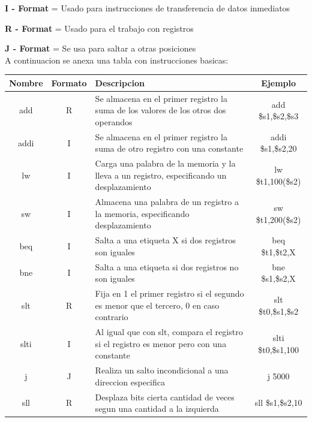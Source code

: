 \documentclass{article}
\begin{document}
    \textbf{I - Format} = Usado para instrucciones de transferencia de datos inmediatos

    \textbf{R - Format} = Usado para el trabajo con registros 

    \textbf{J - Format }= Se usa para saltar a otras posiciones \\
    
A continuacion se anexa una tabla con instrucciones basicas:

\begin{table}[h]
\centering
\begin{tabular}{|c|c|p{6.5cm}|c|}
\hline
\textbf{Nombre} & \textbf{Formato} & \textbf{Descripcion} & \textbf{Ejemplo} \\ \hline
add  & R & Se almacena en el primer registro la suma de los valores de los otros dos operandos & add \$s1,\$s2,\$s3 \\ \hline
addi & I & Se almacena en el primer registro la suma de otro registro con una constante & addi \$s1,\$s2,20 \\ \hline
lw   & I & Carga una palabra de la memoria y la lleva a un registro, especificando un desplazamiento & lw \$t1,100(\$s2) \\ \hline
sw   & I & Almacena una palabra de un registro a la memoria, especificando desplazamiento & sw \$t1,200(\$s2) \\ \hline
beq  & I & Salta a una etiqueta X si dos registros son iguales & beq \$t1,\$t2,X \\ \hline
bne  & I & Salta a una etiqueta si dos registros no son iguales & bne \$s1,\$s2,X \\ \hline
slt  & R & Fija en 1 el primer registro si el segundo es menor que el tercero, 0 en caso contrario & slt \$t0,\$s1,\$s2 \\ \hline
slti & I & Al igual que con slt, compara el registro si el registro es menor pero con una constante & slti \$t0,\$s1,100 \\ \hline
j    & J & Realiza un salto incondicional a una direccion especifica & j 5000 \\ \hline
sll  & R & Desplaza bits cierta cantidad de veces segun una cantidad a la izquierda & sll \$s1,\$s2,10 \\ \hline
\end{tabular}
\end{table}
\end{document}
